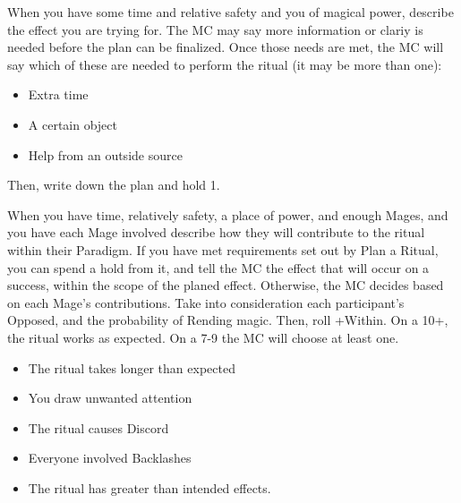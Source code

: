 \begin{multicols}{3}
\begin{move}
  \end{move}

  \columnbreak
  
  \begin{move}
    When you have some time and relative safety and you  of magical power, describe the effect you are trying for. The MC may say more information or clariy is needed before the plan can be finalized. Once those needs are met, the MC will say which of these are needed to perform the ritual (it may be more than one):

    \begin{itemize}
      \setlength\itemsep{0em}
    \item Extra time
    \item A certain object
    \item Help from an outside source 
    \end{itemize}
Then, write down the plan and hold 1.

  \end{move}

  \SEPARATOR

  \begin{move}
    When you have time, relatively safety, a place of power, and enough Mages, and you  have each Mage involved describe how they will contribute to the ritual within their Paradigm. If you have met requirements set out by Plan a Ritual, you can spend a hold from it, and tell the MC the effect that will occur on a success, within the scope of the planed effect. Otherwise, the MC decides based on each Mage’s contributions. Take into consideration each participant’s Opposed, and the probability of Rending magic. Then, roll +Within. On a 10+, the ritual works as expected. On a 7-9 the MC will choose at least one.

    \begin{itemize}
      \setlength\itemsep{0em}
    \item The ritual takes longer than expected
    \item You draw unwanted attention
    \item The ritual causes Discord
    \item Everyone involved Backlashes
    \item The ritual has greater than intended effects.
    \end{itemize}

  \end{move}


\end{multicols}
